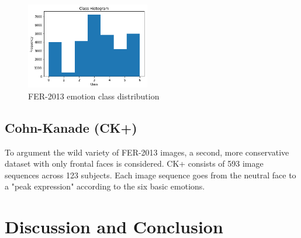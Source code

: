 \documentclass[twoside]{article}
\begin{document}
\begin{multicols}{2}
\begin{figure}[H]
	\includegraphics[width=0.48\textwidth]{class_dist}
	\caption{FER-2013 emotion class distribution}
\end{figure}

\subsection{Cohn-Kanade (CK+)}
To argument the wild variety of FER-2013 images, a second, more conservative dataset with only frontal faces is considered. CK+ consists of 593 image sequences across 123 subjects. Each image sequence goes from the neutral face to a "peak expression" according to the six basic emotions.





\section{Discussion and Conclusion}




\begin{thebibliography}{99} %









 
\end{thebibliography}


\end{multicols}
\end{document}
